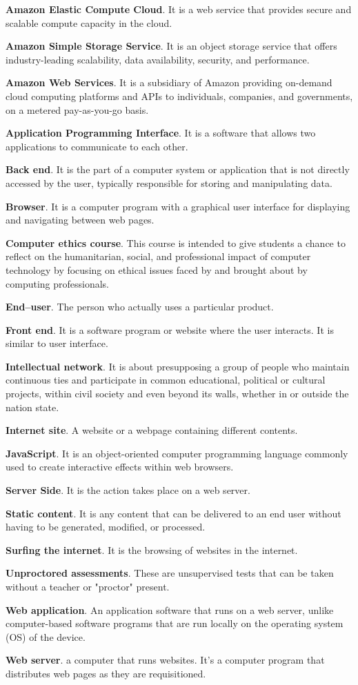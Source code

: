 \textbf{Amazon Elastic Compute Cloud}.
It is a web service that provides secure and scalable compute capacity in the cloud.

\textbf{Amazon Simple Storage Service}.
It is an object storage service that offers industry-leading scalability, data availability, security, and performance.

\textbf{Amazon Web Services}.
It is a subsidiary of Amazon providing on-demand cloud computing platforms and APIs to individuals, companies, and governments, on a metered pay-as-you-go basis.

\textbf{Application Programming Interface}.
It is a software that allows two applications to communicate to each other.

\textbf{Back end}.
It is the part of a computer system or application that is not directly accessed by the user, typically responsible for storing and manipulating data.

\textbf{Browser}.
It is a computer program with a graphical user interface for displaying and navigating between web pages.

\textbf{Computer ethics course}.
This course is intended to give students a chance to reflect on the humanitarian, social, and professional impact of computer technology by focusing on ethical issues faced by and brought about by computing professionals.

\textbf{End–user}.
The person who actually uses a particular product.

\textbf{Front end}.
It is a software program or website where the user interacts. It is similar to user interface.

\textbf{Intellectual network}.
It is about presupposing a group of people who maintain continuous ties and participate in common educational, political or cultural projects, within civil society and even beyond its walls, whether in or outside the nation state.

\textbf{Internet site}.
A website or a webpage containing different contents.

\textbf{JavaScript}.
It is an object-oriented computer programming language commonly used to create interactive effects within web browsers.

\textbf{Server Side}.
It is the action takes place on a web server.

\textbf{Static content}.
It is any content that can be delivered to an end user without having to be generated, modified, or processed.

\textbf{Surfing the internet}.
It is the browsing of websites in the internet.

\textbf{Unproctored assessments}.
These are unsupervised tests that can be taken without a teacher or "proctor" present.

\textbf{Web application}.
An application software that runs on a web server, unlike computer-based software programs that are run locally on the operating system (OS) of the device.

\textbf{Web server}.
a computer that runs websites. It's a computer program that distributes web pages as they are requisitioned.
